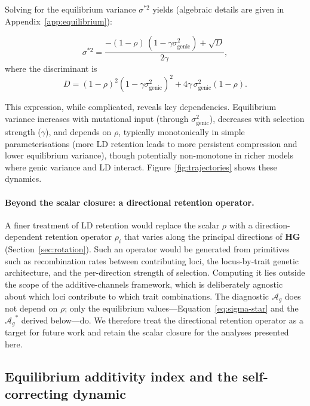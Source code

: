 \documentclass[9pt,twocolumn,twoside,lineno]{gsajnl}
\newcommand{\mat}[1]{\mathbf{#1}}
\newcommand{\Ag}{\ensuremath{\mathcal{A}_{g}}\xspace}
\begin{document}
Solving for the equilibrium variance $\sigma^{*2}$ yields (algebraic details are given in Appendix~\ref{app:equilibrium}):

\begin{equation}
\sigma^{*2}
= \frac{-(1-\rho)\,(1-\gamma\sigma^2_{\text{genic}}) + \sqrt{D}}{2\gamma},
\label{eq:sigma-star}
\end{equation}
where the discriminant is
\begin{equation}
D = (1-\rho)^2(1-\gamma\sigma^2_{\text{genic}})^2 + 4\gamma\,\sigma^2_{\text{genic}}(1-\rho).
\label{eq:sigma-star-discriminant}
\end{equation}

This expression, while complicated, reveals key dependencies. Equilibrium variance increases with mutational input (through $\sigma^2_{\text{genic}}$), decreases with selection strength ($\gamma$), and depends on $\rho$, typically monotonically in simple parameterisations (more LD retention leads to more persistent compression and lower equilibrium variance), though potentially non-monotone in richer models where genic variance and LD interact. Figure~\ref{fig:trajectories} shows these dynamics.

\paragraph{Beyond the scalar closure: a directional retention operator.}
A finer treatment of LD retention would replace the scalar $\rho$ with a direction-dependent retention operator $\rho_i$ that varies along the principal directions of $\mat{H}\mat{G}$ (Section~\ref{sec:rotation}). Such an operator would be generated from primitives such as recombination rates between contributing loci, the locus-by-trait genetic architecture, and the per-direction strength of selection. Computing it lies outside the scope of the additive-channels framework, which is deliberately agnostic about which loci contribute to which trait combinations. The diagnostic \Ag does not depend on $\rho$; only the equilibrium values---Equation~\eqref{eq:sigma-star} and the $\Ag^*$ derived below---do. We therefore treat the directional retention operator as a target for future work and retain the scalar closure for the analyses presented here.

\subsection{Equilibrium additivity index and the self-correcting dynamic}
\end{document}
